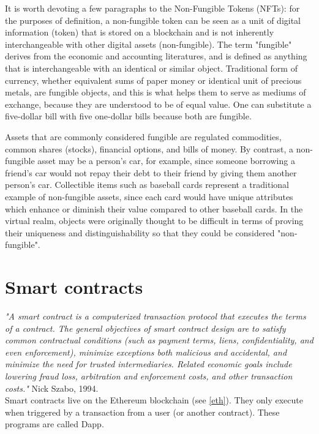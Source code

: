 \documentclass[MSE,Master,english]{twbook}%
\begin{document}
It is worth devoting a few paragraphs to the Non-Fungible Tokens (\glspl{NFT}): for the purposes of definition, a non-fungible token\cite{nft} can be seen as a unit of digital information (token) that is stored on a blockchain and is not inherently interchangeable with other digital assets (non-fungible). The term "fungible" derives from the economic and accounting literatures, and is defined as anything that is interchangeable with an identical or similar object. Traditional form of currency, whether equivalent sums of paper money or identical unit of precious metals, are fungible objects, and this is what helps them to serve as mediums of exchange, because they are understood to be of equal value. One can substitute a five-dollar bill with five one-dollar bills because both are fungible.

Assets that are commonly considered fungible are regulated commodities, common shares (stocks), financial options, and bills of money. By contrast, a non-fungible asset may be a person's car, for example, since someone borrowing a friend's car would not repay their debt to their friend by giving them another person's car. Collectible items such as baseball cards represent a traditional example of non-fungible assets, since each card would have unique attributes which enhance or diminish their value compared to other baseball cards. In the virtual realm, objects were originally thought to be difficult in terms of proving their uniqueness and distinguishability so that they could be considered "non-fungible".

\section{Smart contracts\label{sm}}
\emph{"A smart contract is a computerized transaction protocol that executes the terms of a contract. The general objectives of smart contract design are to satisfy common contractual conditions (such as payment terms, liens, confidentiality, and even enforcement), minimize exceptions both malicious and accidental, and minimize the need for trusted intermediaries. Related economic goals include lowering fraud loss, arbitration and enforcement costs, and other transaction costs."} Nick Szabo, 1994.\cite{smartContracts} \\

Smart contracts live on the Ethereum blockchain  (see \ref{eth}). They only execute when triggered by a transaction from a user (or another contract). These programs are called \ac{Dapp}.
\end{document}
